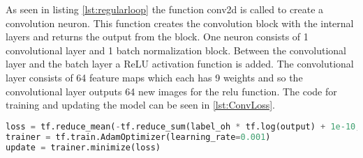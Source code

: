As seen in listing \ref{lst:regularloop} the function conv2d is called to create a convolution neuron. This function creates the convolution block with the internal layers and returns the output from the block. One neuron consists of 1 convolutional layer and 1 batch normalization block. Between the convolutional layer and the batch layer a ReLU activation function is added. The convolutional layer consists of 64 feature maps which each has 9 weights and so the convolutional layer outputs 64 new images for the relu function. The code for training and updating the model can be seen in \ref{lst:ConvLoss}.

\begin{lstlisting}[language=Python, label=lst:ConvLoss, caption= Implementation of learning rate type ADAM]
loss = tf.reduce_mean(-tf.reduce_sum(label_oh * tf.log(output) + 1e-10, axis=[1]))
trainer = tf.train.AdamOptimizer(learning_rate=0.001)
update = trainer.minimize(loss)
\end{lstlisting}